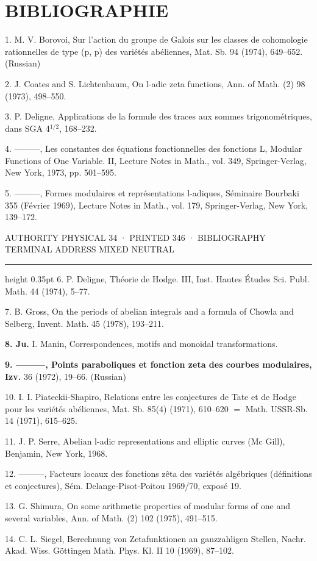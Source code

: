 \documentclass[10pt,twoside]{article}
\newcommand{\PageUnit}[3]{%
  \par\noindent\hypertarget{record-#1}{}%
  \pdfbookmark[1]{Authority page #1 · printed #2}{bookmark-#1}%
  {\sffamily\footnotesize\color{D030Muted}AUTHORITY PHYSICAL #1 · PRINTED #2 · #3}%
  \par\vspace{0.35em}\hrule height 0.35pt\vspace{0.8em}}
\newcommand{\SectionLead}[1]{\textbf{\color{D030Accent}#1}}
\begin{document}
\section*{BIBLIOGRAPHIE}
1. M. V. Borovoi, Sur l’action du groupe de Galois sur les classes de cohomologie rationnelles de type (p, p) des variétés abéliennes, Mat. Sb. 94 (1974), 649–652. (Russian)\par
2. J. Coates and S. Lichtenbaum, On l-adic zeta functions, Ann. of Math. (2) 98 (1973), 498–550.\par
3. P. Deligne, Applications de la formule des traces aux sommes trigonométriques, dans SGA 4\ensuremath{^{1/2}}, 168–232.\par
4. ———, Les constantes des équations fonctionnelles des fonctions L, Modular Functions of One Variable. II, Lecture Notes in Math., vol. 349, Springer-Verlag, New York, 1973, pp. 501–595.\par
5. ———, Formes modulaires et représentations l-adiques, Séminaire Bourbaki 355 (Février 1969), Lecture Notes in Math., vol. 179, Springer-Verlag, New York, 139–172.\par
\clearpage
\PageUnit{34}{346}{BIBLIOGRAPHY TERMINAL ADDRESS MIXED NEUTRAL}
6. P. Deligne, Théorie de Hodge. III, Inst. Hautes Études Sci. Publ. Math. 44 (1974), 5–77.\par
7. B. Gross, On the periods of abelian integrals and a formula of Chowla and Selberg, Invent. Math. 45 (1978), 193–211.\par
\SectionLead{8. Ju.} I. Manin, Correspondences, motifs and monoidal transformations.\par
\SectionLead{9. ———, Points paraboliques et fonction zeta des courbes modulaires, Izv.} 36 (1972), 19–66. (Russian)\par
10. I. I. Piateckii-Shapiro, Relations entre les conjectures de Tate et de Hodge pour les variétés abéliennes, Mat. Sb. 85(4) (1971), 610–620 \ensuremath{=} Math. USSR-Sb. 14 (1971), 615–625.\par
11. J. P. Serre, Abelian l-adic representations and elliptic curves (Mc Gill), Benjamin, New York, 1968.\par
12. ———, Facteurs locaux des fonctions zêta des variétés algébriques (définitions et conjectures), Sém. Delange-Pisot-Poitou 1969/70, exposé 19.\par
13. G. Shimura, On some arithmetic properties of modular forms of one and several variables, Ann. of Math. (2) 102 (1975), 491–515.\par
14. C. L. Siegel, Berechnung von Zetafunktionen an ganzzahligen Stellen, Nachr. Akad. Wiss. Göttingen Math. Phys. Kl. II 10 (1969), 87–102.\par
\end{document}
